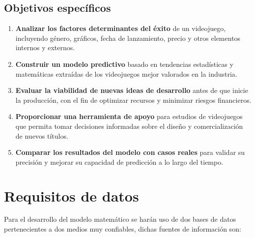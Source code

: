 \documentclass[titlepage,a4paper]{article}
\begin{document}
\subsection{Objetivos específicos}

\begin{enumerate}

    \item \textbf{Analizar los factores determinantes del éxito} de un videojuego, incluyendo género, gráficos, fecha de lanzamiento, precio y otros elementos internos y externos. \\
    
    \item \textbf{Construir un modelo predictivo }basado en tendencias estadísticas y matemáticas extraídas de los videojuegos mejor valorados en la industria. \\
    
    \item \textbf{Evaluar la viabilidad de nuevas ideas de desarrollo} antes de que inicie la producción, con el fin de optimizar recursos y minimizar riesgos financieros. \\
    
    \item \textbf{Proporcionar una herramienta de apoyo} para estudios de videojuegos que permita tomar decisiones informadas sobre el diseño y comercialización de nuevos títulos.

    \item \textbf{Comparar los resultados del modelo con casos reales} para validar su precisión y mejorar su capacidad de predicción a lo largo del tiempo.

\end{enumerate}

\vspace{1cm}

\section{Requisitos de datos}

Para el desarrollo del modelo matemático se harán uso de dos bases de datos pertenecientes a dos medios muy confiables, dichas fuentes de información son: \\
\end{document}
